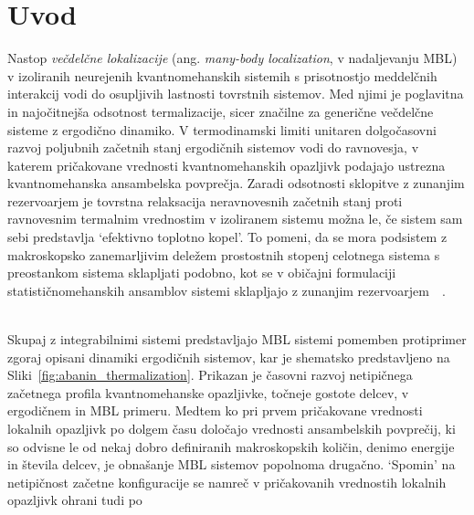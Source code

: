 \documentclass[10pt,a4paper]{article}
\begin{document}
\section{Uvod}
Nastop \emph{večdelčne lokalizacije} (ang. \emph{many-body localization}, v nadaljevanju MBL) v izoliranih neurejenih kvantnomehanskih sistemih s prisotnostjo meddelčnih interakcij vodi do osupljivih lastnosti tovrstnih sistemov. Med njimi je poglavitna in najočitnejša odsotnost termalizacije, sicer značilne za generične večdelčne sisteme z ergodično dinamiko. V termodinamski limiti unitaren dolgočasovni razvoj poljubnih začetnih stanj ergodičnih sistemov vodi do ravnovesja, v katerem pričakovane vrednosti kvantnomehanskih opazljivk podajajo ustrezna kvantnomehanska ansambelska povprečja. Zaradi odsotnosti sklopitve z zunanjim rezervoarjem je tovrstna relaksacija neravnovesnih začetnih stanj proti ravnovesnim termalnim vrednostim v izoliranem sistemu možna le, če sistem sam sebi predstavlja `efektivno toplotno kopel'. To pomeni, da se mora podsistem z makroskopsko zanemarljivim deležem prostostnih stopenj  celotnega sistema s preostankom sistema sklapljati podobno, kot se v običajni formulaciji statističnomehanskih ansamblov sistemi sklapljajo z zunanjim rezervoarjem~\cite{abanin2018ergodicity}~\cite{nandkishore2015many}. \\
\begin{minipage}[t]{0.42\textwidth}
\noindent \\
Skupaj z integrabilnimi sistemi predstavljajo MBL sistemi pomemben protiprimer
zgoraj opisani dinamiki ergodičnih sistemov, kar je shematsko predstavljeno na Sliki~\ref{fig:abanin_thermalization}. Prikazan je časovni razvoj netipičnega začetnega profila kvantnomehanske opazljivke, točneje gostote delcev, v ergodičnem in MBL primeru. Medtem ko pri prvem pričakovane vrednosti lokalnih opazljivk po dolgem času določajo vrednosti ansambelskih povprečij, ki so odvisne le od nekaj dobro definiranih makroskopskih količin, denimo energije in števila delcev, je obnašanje MBL sistemov popolnoma drugačno. `Spomin' na netipičnost začetne konfiguracije se namreč v pričakovanih vrednostih lokalnih opazljivk ohrani tudi po 
\end{minipage}\hfill
\end{document}
